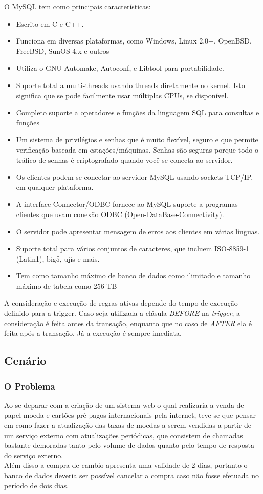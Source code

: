 \documentclass[conference]{IEEEtran}
\begin{document}
	  
    O MySQL tem como principais características:
    \begin{itemize}
    \item Escrito em C e C++.
    \item Funciona em diversas plataformas, como Windows, Linux 2.0+, OpenBSD, FreeBSD, SunOS 4.x e outros
    \item Utiliza o GNU Automake, Autoconf, e Libtool para portabilidade.
    \item Suporte total a multi-threads usando threads diretamente no kernel. Isto significa que se pode facilmente usar múltiplas CPUs, se disponível.
    \item Completo suporte a operadores e funções da linguagem SQL para consultas e funções
    \item Um sistema de privilégios e senhas que é muito flexível, seguro e que permite verificação baseada em estações/máquinas. Senhas são seguras porque todo o tráfico de senhas é criptografado quando você se conecta ao servidor.
    \item Os clientes podem se conectar ao servidor MySQL usando sockets TCP/IP, em qualquer plataforma.
    \item A interface Connector/ODBC fornece ao MySQL suporte a programas clientes que usam conexão ODBC (Open-DataBase-Connectivity). 
    \item O servidor pode apresentar mensagem de erros aos clientes em várias línguas. 
    \item Suporte total para vários conjuntos de caracteres, que incluem ISO-8859-1 (Latin1), big5, ujis e mais.
    \item Tem como tamanho máximo de banco de dados como ilimitado e tamanho máximo de tabela como 256 TB
    \end{itemize}
    A consideração e execução de regras ativas depende do tempo de execução definido para a trigger. Caso seja utilizada a clásula \textit{BEFORE} na \textit{trigger}, a consideração é feita antes da transação, enquanto que no caso de \textit{AFTER} ela é feita após a transação. Já a execução é sempre imediata.\cite{caracteristica-myssql}

  \subsection{Cenário}
    \subsubsection{O Problema} Ao se deparar com a criação de um sistema web o qual realizaria a venda de papel moeda e cartões pré-pagos internacionais pela internet, teve-se que pensar em como fazer a atualização das taxas de moedas a serem vendidas a partir de um serviço externo com atualizações periódicas, que consistem de chamadas bastante demoradas tanto pelo volume de dados quanto pelo tempo de resposta do serviço externo.\\
    Além disso a compra de cambio apresenta uma validade de 2 dias, portanto o banco de dados deveria ser possível cancelar a compra caso não fosse efetuada no período de dois dias.
\end{document}
